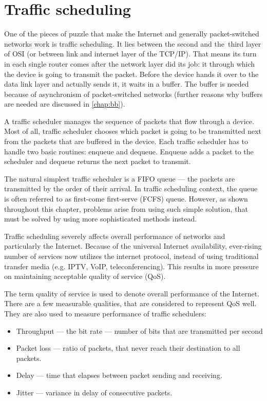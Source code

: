 \chapter{Traffic scheduling}
\label{chap1}
One of the pieces of puzzle that make the Internet and generally packet-switched networks work is traffic scheduling. It lies between the second and the~third layer of OSI (or between link and internet layer of the TCP/IP). That means its turn in each single router comes after the network layer did its job: it  through which the device is going to transmit the packet. Before the device hands it over to the data link layer and actually sends it, it waits in a buffer. The buffer is needed because of asynchronism of packet-switched networks (further reasons why buffers are needed are discussed in \autoref{chap:bb}).

A traffic scheduler manages the sequence of packets that flow through a device. Most of all, traffic scheduler chooses which packet is going to be transmitted next from the packets that are buffered in the device. Each traffic scheduler has to handle two basic routines: enqueue and dequeue. Enqueue adds a packet to the scheduler and dequeue returns the next packet to transmit.

The natural simplest traffic scheduler is a FIFO queue --- the packets are transmitted by the order of their arrival. In traffic scheduling context, the queue is often referred to as first-come first-serve (FCFS) queue. However, as shown throughout this chapter, problems arise from using such simple solution, that must be solved by using more sophisticated methods instead.

Traffic scheduling severely affects overall performance of networks and particularly the Internet. Because of the universal Internet availability, ever-rising number of services now utilizes the internet protocol, instead of using traditional transfer media (e.g. IPTV, VoIP, teleconferencing). This results in more pressure on maintaining acceptable quality of service (QoS).

The term quality of service is used to denote overall performance of the Internet. There are a few measurable qualities, that are considered to represent QoS well. They are also used to measure performance of traffic schedulers:
\begin{itemize}
	\item Throughput --- the bit rate --- number of bits that are transmitted per second
	\item Packet loss --- ratio of packets, that never reach their destination to all packets.
	\item Delay --- time that elapses between packet sending and receiving.
	\item Jitter --- variance in delay of consecutive packets.
\end{itemize}

